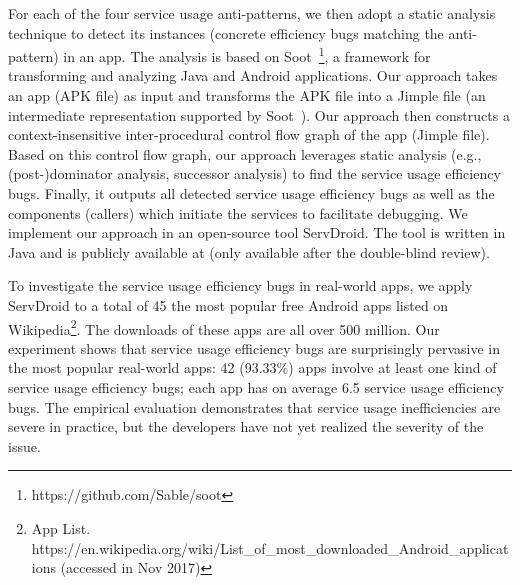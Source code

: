 \documentclass[sigconf,review, anonymous]{acmart}
\begin{document}
For each of the four service usage anti-patterns, we then adopt a static analysis technique to detect its instances (concrete efficiency bugs matching the anti-pattern) in an app. The analysis is based on \textsf{Soot}~\cite{sootpaper}\footnote{https://github.com/Sable/soot}, a framework for transforming and analyzing Java and Android applications. Our approach takes an app (APK file) as input and transforms the APK file into a Jimple file (an intermediate representation supported by \textsf{Soot}~\cite{BartelKTM12}). Our approach then constructs a context-insensitive inter-procedural control flow graph of the app (Jimple file). Based on this control flow graph, our approach leverages static analysis (e.g., (post-)dominator analysis, successor analysis) to find the service usage efficiency bugs. Finally, it outputs all detected service usage efficiency bugs as well as the components (callers) which initiate the services to facilitate debugging.  We implement our approach in an open-source tool \textsf{ServDroid}. The tool is written in Java and is publicly available at (only available after the double-blind review). 

To investigate the service usage efficiency bugs in real-world apps, we apply \textsf{ServDroid} to a total of 45 the most popular free Android apps listed on Wikipedia\footnote{App List. https://en.wikipedia.org/wiki/List\_of\_most\_downloaded\_Android\_applications (accessed in Nov 2017)}. The downloads of these apps are all over 500 million. Our experiment shows that service usage efficiency bugs are surprisingly pervasive in the most popular real-world apps: 42 (93.33\%) apps involve at least one kind of service usage efficiency bugs; each app has on average 6.5 service usage efficiency bugs. The empirical evaluation demonstrates that service usage inefficiencies are severe in practice, but the developers have not yet realized the severity of the issue. 


\end{document}
